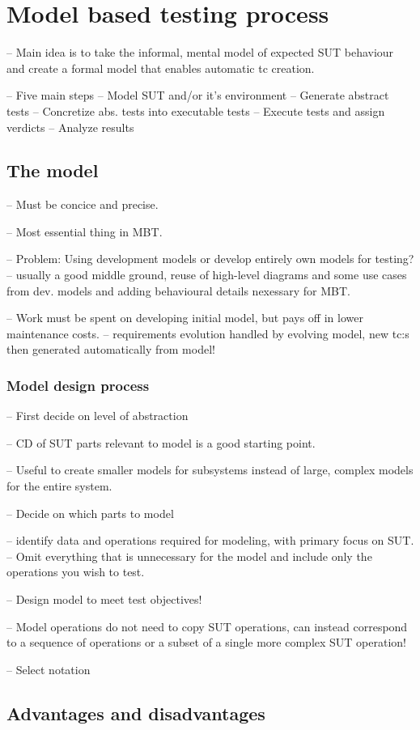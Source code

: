 \section{Model based testing process}
-- Main idea is to take the informal, mental model of expected SUT behaviour and create a formal model that enables automatic tc creation. 

-- Five main steps
	-- Model SUT and/or it's environment
	-- Generate abstract tests
	-- Concretize abs. tests into executable tests
	-- Execute tests and assign verdicts
	-- Analyze results
	


\subsection{The model}
-- Must be concice and precise. 

-- Most essential thing in MBT.

-- Problem: Using development models or develop entirely own models for testing? 
	-- usually a good middle ground, reuse of high-level diagrams and some use cases from dev. models and adding behavioural details nexessary for MBT.

-- Work must be spent on developing initial model, but pays off in lower maintenance costs.
	-- requirements evolution handled by evolving model, new tc:s then generated automatically from model! 
	
\subsubsection{Model design process}
-- First decide on level of abstraction

-- CD of SUT parts relevant to model is a good starting point.

-- Useful to create smaller models for subsystems instead of large, complex models for the entire system. 

-- Decide on which parts to model

-- identify data and operations required for modeling, with primary focus on SUT.
	-- Omit everything that is unnecessary for the model and include only the operations you wish to test.
	
-- Design model to meet test objectives!

-- Model operations do not need to copy SUT operations, can instead correspond to a sequence of operations or a subset of a single more complex SUT operation!

-- Select notation

\subsection{Advantages and disadvantages}